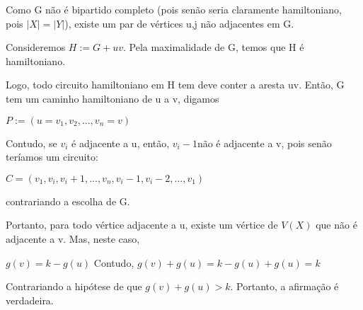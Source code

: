 \documentclass{article}
\begin{document}
	Como G não é bipartido completo (pois senão seria claramente hamiltoniano, pois $|X| = |Y|$), existe um par de vértices u,j não adjacentes em G.
	
	Consideremos $H := G + uv$. Pela maximalidade de G, temos que H é hamiltoniano.
	
	Logo, todo circuito hamiltoniano em H tem deve conter a aresta uv. Então, G tem um caminho hamiltoniano de u a v, digamos
	
	$P := (u = v_1, v_2, ..., v_n = v)$
	
	Contudo, se $v_i$ é adjacente a u, então, $v_i-1$não é adjacente a v, pois senão teríamos um circuito:
	
	$C = (v_1, v_i, v_i+1,..., v_n, v_i-1, v_i-2,..., v_1)$
	
	contrariando a escolha de G.
	
	Portanto, para todo vértice adjacente a u, existe um vértice de $V(X)$ que não é adjacente a v. Mas, neste caso,
	
	$g(v) = k - g(u)$
	Contudo,
	$g(v) + g(u) = k - g(u) + g(u) = k$
	
	Contrariando a hipótese de que $g(v) + g(u) > k$.
	Portanto, a afirmação é verdadeira.
	
	
	
	
	
\end{document}
